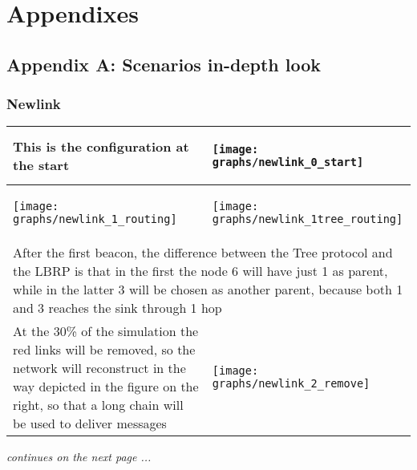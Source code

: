 \documentclass{article}
\begin{document}
\section{Appendixes}
\subsection{Appendix A: Scenarios in-depth look}
\subsubsection{Newlink}
	\bigskip
	\bigskip
	\begin{table}[H]
		\centering
		\begin{tabular}{*{2}{m{}}}
			\hline
			\small This is the configuration at the start&\begin{center}\texttt{[image: graphs/newlink\_0\_start]}\end{center}\\
			\hline
			\begin{center}\texttt{[image: graphs/newlink\_1\_routing]}\end{center}&\begin{center}\texttt{[image: graphs/newlink\_1tree\_routing]}\end{center}\\
			\multicolumn{2}{p{12cm}}{\small After the first beacon, the difference between the Tree protocol and the LBRP is that in the first the node 6 will have just 1 as parent, while in the latter 3 will be chosen as another parent, because both 1 and 3 reaches the sink through 1 hop}\\
			\hline
			\small At the 30\% of the simulation the red links will be removed, so the network will reconstruct in the way depicted in the figure on the right, so that a long chain will be used to deliver messages&\begin{center}\texttt{[image: graphs/newlink\_2\_remove]}\end{center}\\
			\hline
		\end{tabular}
		\label{tab:newlinkIndepthP1}
	\end{table}
	\begin{center}
	\small \textit{continues on the next page ...}
	\end{center}
	\clearpage
\end{document}
